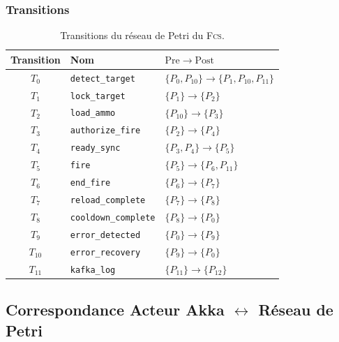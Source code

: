 \documentclass[11pt,a4paper]{article}
\newcommand{\fcs}{\textsc{Fcs}\xspace}
\newcommand{\code}[1]{\texttt{#1}}
\begin{document}
\subsubsection{Transitions}

\begin{table}[H]
\centering\small
\begin{tabular}{c l l}
\toprule
\rowcolor{tableheader}\textbf{Transition} & \textbf{Nom} & \textbf{$\mathrm{Pre} \to \mathrm{Post}$} \\
\midrule
$T_0$    & \code{detect\_target}     & $\{P_0, P_{10}\} \to \{P_1, P_{10}, P_{11}\}$ \\
$T_1$    & \code{lock\_target}       & $\{P_1\} \to \{P_2\}$ \\
$T_2$    & \code{load\_ammo}         & $\{P_{10}\} \to \{P_3\}$ \\
$T_3$    & \code{authorize\_fire}    & $\{P_2\} \to \{P_4\}$ \\
$T_4$    & \code{ready\_sync}        & $\{P_3, P_4\} \to \{P_5\}$ \\
$T_5$    & \code{fire}               & $\{P_5\} \to \{P_6, P_{11}\}$ \\
$T_6$    & \code{end\_fire}          & $\{P_6\} \to \{P_7\}$ \\
$T_7$    & \code{reload\_complete}   & $\{P_7\} \to \{P_8\}$ \\
$T_8$    & \code{cooldown\_complete} & $\{P_8\} \to \{P_0\}$ \\
$T_9$    & \code{error\_detected}    & $\{P_0\} \to \{P_9\}$ \\
$T_{10}$ & \code{error\_recovery}    & $\{P_9\} \to \{P_0\}$ \\
$T_{11}$ & \code{kafka\_log}         & $\{P_{11}\} \to \{P_{12}\}$ \\
\bottomrule
\end{tabular}
\caption{Transitions du réseau de Petri du \fcs.}
\end{table}

\subsection{Correspondance Acteur Akka $\leftrightarrow$ Réseau de Petri}
\end{document}
